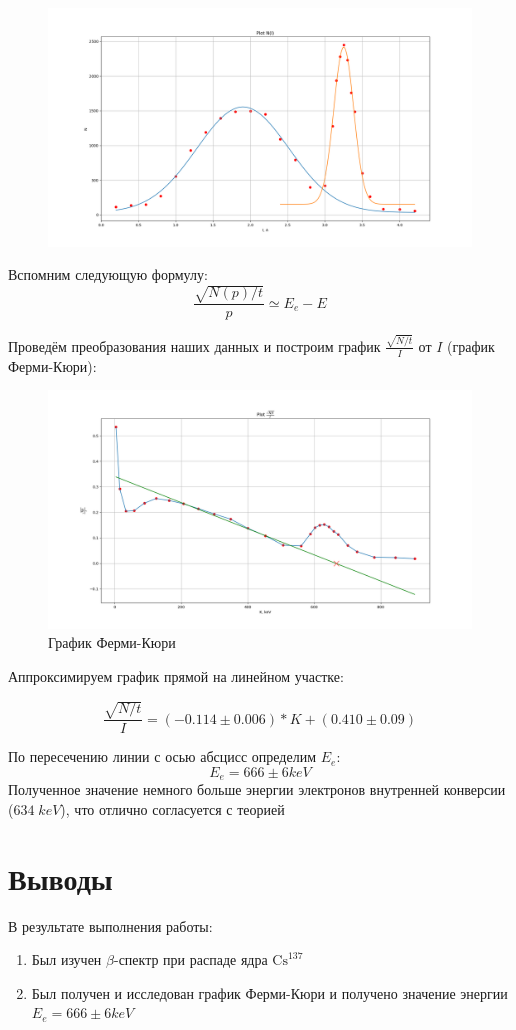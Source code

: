 \documentclass{article}
\begin{document}
\begin{figure}[H]
	\includegraphics[width=\textwidth]{I-N.png}
\end{figure}

Вспомним следующую формулу:
\[ \frac{\sqrt{N(p)/t}}{p} \simeq E_e - E \]

Проведём преобразования наших данных и построим график \(\frac{\sqrt{N/t}}{I}\) от \(I\)
(график Ферми-Кюри):

\begin{figure}[H]
	\includegraphics[width=\textwidth]{K-Nr.png}
	\caption{График Ферми-Кюри}
\end{figure}

Аппроксимируем график прямой на линейном участке:

\[ \frac{\sqrt{N/t}}{I} = (-0.114 \pm 0.006) * K + (0.410 \pm 0.09)\]

По пересечению линии с осью абсцисс определим \(E_e\):
\[ E_e = 666 \pm 6 keV\]
Полученное значение	немного больше энергии электронов внутренней конверсии (\(634\; keV\)),
что отлично согласуется с теорией

\section{Выводы}
В результате выполнения работы:
\begin{enumerate}
	\item Был изучен \(\beta\)-спектр при распаде ядра \(\text{Cs}^{137}\)
	\item Был получен и исследован график Ферми-Кюри и получено значение энергии \(E_e = 666 \pm 6 keV\)
\end{enumerate}
\end{document}
